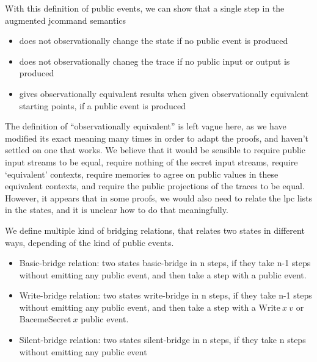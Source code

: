 \documentclass[10pt]{article}
\newcommand{\lpc}{\mathrm{lpc}}
\begin{document}
With this definition of public events, we can show that a single step in the augmented jcommand semantics
\begin{itemize}
\item does not observationally change the state if no public event is produced
\item does not observationally chaneg the trace if no public input or output is produced
\item gives observationally equivalent results when given observationally equivalent starting points, if a public event is produced
\end{itemize}

The definition of ``observationally equivalent'' is left vague here, as we have modified its exact meaning many times in order to adapt the proofs, and haven't settled on one that works. We believe that it would be sensible to require public input streams to be equal, require nothing of the secret input streams, require `equivalent' contexts, require memories to agree on public values in these equivalent contexts, and require the public projections of the traces to be equal. However, it appears that in some proofs, we would also need to relate the \( \lpc \) lists in the states, and it is unclear how to do that meaningfully.


We define multiple kind of bridging relations, that relates two states in different ways, depending
of the kind of public events.

\begin{itemize}
  \item Basic-bridge relation: %
        two states basic-bridge in n steps, if they take n-1 steps without emitting any public
        event, and then take a step with a public event.
  \item Write-bridge relation: %
        two states write-bridge in n steps, if they take n-1 steps without emitting any public
        event, and then take a step with a \( \mathrm{Write}~x~v \) or \( \mathrm{BacemeSecret}~x \) public event.
  \item Silent-bridge relation: %
    two states silent-bridge in n steps, if they take n steps without emitting any public event
\end{itemize}
\end{document}
